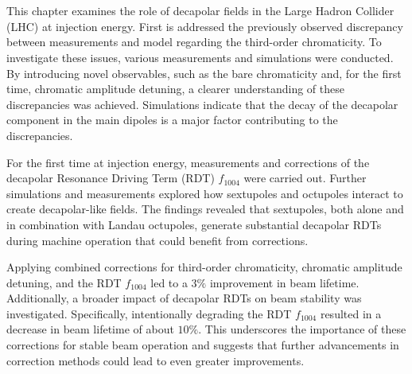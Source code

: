 
\section{}
This chapter examines the role of decapolar fields in the Large Hadron Collider (LHC) at injection
energy. First is addressed the previously observed discrepancy between measurements and model
regarding the third-order chromaticity. To investigate these issues, various measurements and
simulations were conducted. By introducing novel observables, such as the bare chromaticity and, for the
first time, chromatic amplitude detuning, a clearer understanding of these discrepancies was
achieved. Simulations indicate that the decay of the decapolar component in the main dipoles is a
major factor contributing to the discrepancies.

For the first time at injection energy, measurements and corrections of the decapolar Resonance
Driving Term (RDT) $f_{1004}$ were carried out. Further simulations and measurements explored how
sextupoles and octupoles interact to create decapolar-like fields. The findings revealed that
sextupoles, both alone and in combination with Landau octupoles, generate substantial decapolar RDTs
during machine operation that could benefit from corrections.

Applying combined corrections for third-order chromaticity, chromatic amplitude detuning, and the
RDT $f_{1004}$ led to a $3\%$ improvement in beam lifetime. Additionally, a broader impact of
decapolar RDTs on beam stability was investigated. Specifically, intentionally degrading the RDT
$f_{1004}$ resulted in a decrease in beam lifetime of about $10\%$. This underscores the importance
of these corrections for stable beam operation and suggests that further advancements in correction
methods could lead to even greater improvements. 